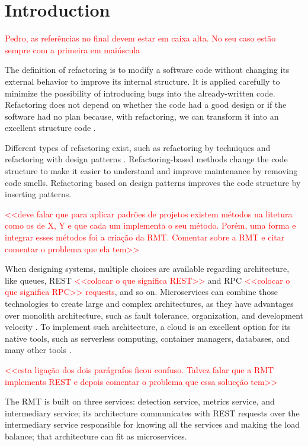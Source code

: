 \chapter{Introduction}%
\label{chpt-intro}
\textcolor{red}{Pedro, as referências no final devem estar em caixa alta. No seu caso estão sempre com a primeira em maiúscula}

The definition of refactoring is to modify a software code without changing its external behavior to improve its internal structure. It is applied carefully to minimize the possibility of introducing bugs into the already-written code. Refactoring does not depend on whether the code had a good design or if the software had no plan because, with refactoring, we can transform it into an excellent structure code \cite{fowler2018refactoring}.

Different types of refactoring exist, such as refactoring by techniques \cite{fowler2018refactoring} and refactoring with design patterns \cite{kerievsky2005refactoring}. Refactoring-based methods change the code structure to make it easier to understand and improve maintenance by removing code smells. Refactoring based on design patterns improves the code structure by inserting patterns.

\textcolor{red}{<<deve falar que para aplicar padrões de projetos existem métodos na litetura como os de X, Y e que cada um implementa o seu método. Porém, uma forma e integrar esses métodos foi a criação da RMT. Comentar sobre a RMT e citar comentar o problema que ela tem>>}

When designing systems, multiple choices are available regarding architecture, like queues, REST \textcolor{red}{<<colocar o que significa REST>>} and RPC \textcolor{red}{<<colocar o que significa RPC>> requests}, and so on. Microservices can combine those technologies to create large and complex architectures, as they have advantages over monolith architecture, such as fault tolerance, organization, and development velocity \cite{microservices-comuni}. To implement such architecture, a cloud is an excellent option for its native tools, such as serverless computing, container managers, databases, and many other tools \cite{balalaie2016}.

\textcolor{red}{<<esta ligação dos dois parágrafos ficou confuso. Talvez falar que a RMT implements REST e depois comentar o problema que essa solucção tem>>}

The RMT is built on three services: detection service, metrics service, and intermediary service; its architecture communicates with REST requests over the intermediary service responsible for knowing all the services and making the load balance; that architecture can fit as microservices.

